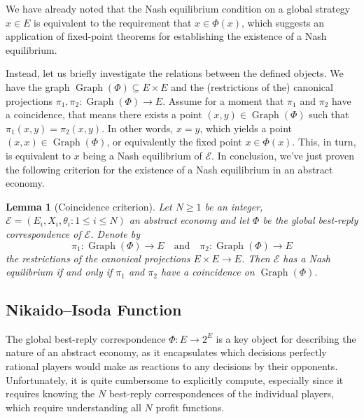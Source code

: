 \documentclass[a4paper,11pt,reqno,english]{amsart}
\newtheorem{lemma}[theorem]{Lemma}
\theoremstyle{definition}
\begin{document}
We have already noted that the Nash equilibrium condition on a global strategy $x\in E$ is equivalent to the requirement that $x\in\Phi(x)$, which suggests an application of fixed-point theorems for establishing the existence of a Nash equilibrium.

Instead, let us briefly investigate the relations between the defined objects.
We have the graph $\operatorname{Graph}(\Phi)\subseteq E\times E$ and the (restrictions of the) canonical projections $\pi_1,\pi_2\colon\operatorname{Graph}(\Phi)\longrightarrow E$.
Assume for a moment that $\pi_1$ and $\pi_2$ have a coincidence, that means there exists a point $(x,y)\in\operatorname{Graph}(\Phi)$ such that $\pi_1(x,y) = \pi_2(x,y)$.
In other words, $x=y$, which yields a point $(x,x)\in\operatorname{Graph}(\Phi)$, or equivalently the fixed point $x\in \Phi(x)$.
This, in turn, is equivalent to $x$ being a Nash equilibrium of $\mathcal{E}$.
In conclusion, we've just proven the following criterion for the existence of a Nash equilibrium in an abstract economy.

\begin{lemma}[Coincidence criterion]\label{lem:CoincidenceCriterion1}
	Let $N\geq 1$ be an integer, $\mathcal{E}=(E_i,X_i,\theta_i : 1\leq i\leq N)$ an abstract economy and let $\Phi$ be the global best-reply correspondence of $\mathcal{E}$. Denote by
	\begin{displaymath}
		\pi_1 \colon \operatorname{Graph}(\Phi)\longrightarrow E \quad \text{and}\quad \pi_2 \colon \operatorname{Graph}(\Phi)\longrightarrow E
	\end{displaymath}
	the restrictions of the canonical projections $E\times E\longrightarrow E$. Then $\mathcal{E}$ has a Nash equilibrium if and only if $\pi_1$ and $\pi_2$ have a coincidence on $\operatorname{Graph}(\Phi)$.
\end{lemma}

\subsection{Nikaido--Isoda Function}\label{subsec:NikaidoIsodaFunction}

The global best-reply correspondence $\Phi\colon E\longrightarrow 2^{E}$ is a key object for describing the nature of an abstract economy, as it encapsulates which decisions perfectly rational players would make as reactions to any decisions by their opponents.
Unfortunately, it is quite cumbersome to explicitly compute, especially since it requires knowing the $N$ best-reply correspondences of the individual players, which require understanding all $N$ profit functions.
\end{document}
